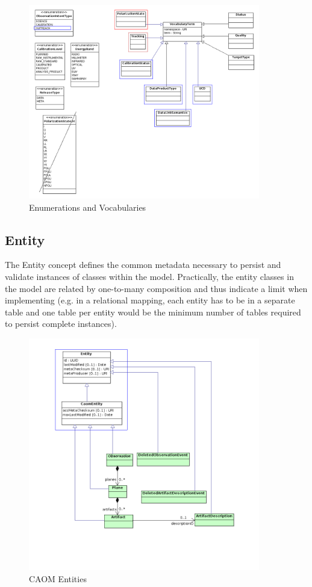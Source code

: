 \documentclass[11pt,a4paper]{ivoa}
\begin{document}
\begin{figure}
\centering
\includegraphics[width=0.9\textwidth]{src/uml/CAOM3vocabularies.png}
\caption{Enumerations and Vocabularies}
\label{fig:vocab}
\end{figure}

\subsection{Entity}

The Entity concept defines the common metadata necessary to persist and validate 
instances of classes within the model. Practically, the entity classes in the 
model are related by one-to-many composition and thus indicate a limit when
implementing (e.g. in a relational mapping, each entity has to be in a separate
table and one table per entity would be the minimum number of tables required 
to persist complete instances).

\begin{figure}
\centering
\includegraphics[width=0.9\textwidth]{src/uml/CAOM4entities.png}
\caption{CAOM Entities}
\label{fig:entity}
\end{figure}
\end{document}
